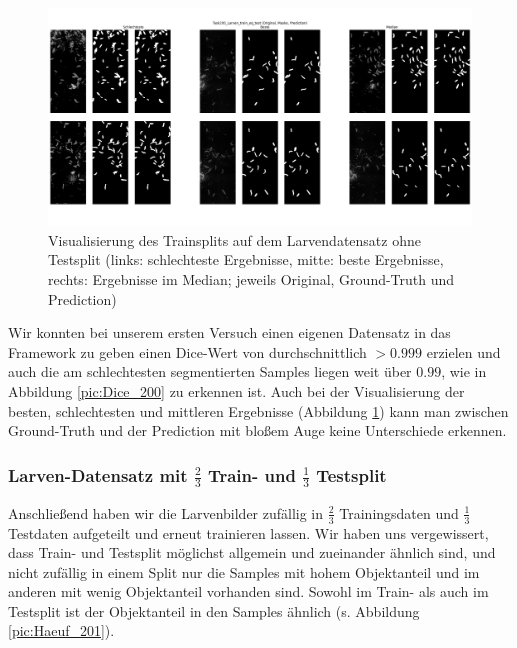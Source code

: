 \begin{figure}[H]
\centering
\includegraphics[height=0.35\textheight, width=\textwidth]{Pictures/nnUnet/Praxis/Task200-Larven-nur-train/Vis-Train.png}
\caption{Visualisierung des Trainsplits auf dem Larvendatensatz ohne Testsplit (links: schlechteste Ergebnisse, mitte: beste Ergebnisse, rechts: Ergebnisse im Median; jeweils Original, Ground-Truth und Prediction)\\[1.8cm]}
\label{pic:Vis-Train_200}

\end{figure}

Wir konnten bei unserem ersten Versuch einen eigenen Datensatz in das Framework zu geben einen Dice-Wert von durchschnittlich $> 0.999$ erzielen und auch die am schlechtesten segmentierten Samples liegen weit über $0.99$, wie in Abbildung \ref{pic:Dice_200} zu erkennen ist.
Auch bei der Visualisierung der besten, schlechtesten und mittleren Ergebnisse (Abbildung \ref{pic:Vis-Train_200}) kann man zwischen Ground-Truth und der Prediction mit bloßem Auge keine Unterschiede erkennen.
\subsubsection{Larven-Datensatz mit $\frac{2}{3}$ Train- und $\frac{1}{3}$ Testsplit}
Anschließend haben wir die Larvenbilder zufällig in $\frac{2}{3}$ Trainingsdaten und $\frac{1}{3}$ Testdaten aufgeteilt und erneut trainieren lassen. Wir haben uns vergewissert, dass Train- und Testsplit möglichst allgemein und zueinander ähnlich sind, und nicht zufällig in einem Split nur die Samples mit hohem Objektanteil und im anderen mit wenig Objektanteil vorhanden sind. Sowohl im Train- als auch im Testsplit ist der Objektanteil in den Samples ähnlich (s. Abbildung \ref{pic:Haeuf_201}).

